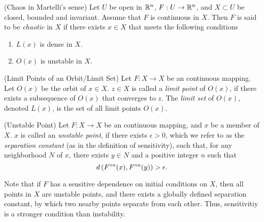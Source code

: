 \documentclass[12pt,draft,twoside]{book}
\begin{document}
  \begin{definition}
    (Chaos in Martelli's sense)
    Let $U$ be open in $\mathbb{R}^n$, $F: U \to \mathbb{R}^n$, and $X\subset U$ be closed, bounded and invariant.
    Assume that $F$ is continuous in $X$.
    Then $F$ is said to be \textit{chaotic} in $X$ if there exists $x \in X$ that meets the following conditions
    \begin{enumerate}
      \item $L(x)$ is dense in $X$.
      \item $O(x)$ is unstable in $X$.
    \end{enumerate}
    \label{defn:martelli}
  \end{definition}
  \begin{definition}
    (Limit Points of an Orbit/Limit Set)
    Let $F: X\to X$ be an continuous mapping.
    Let $O(x)$ be the orbit of $x \in X$.
    $z \in X$ is called a \textit{limit point} of $O(x)$, if there exists a subsequence of $O(x)$ that converges to $z$.
    The \textit{limit set} of $O(x)$, denoted $L(x)$, is the set of all limit points $O(x)$.
    \label{def:limset}
  \end{definition}

  \begin{definition}
    (Unstable Point)
    Let $F: X\to X$ be an continuous mapping, and $x$ be a member of $X$.
  $x$ is called an \textit{unstable point}, if there exists $\epsilon > 0$, which we refer to as the \textit{separation constant} (as in the definition of sensitivity), such that, for any neighborhood $N$ of $x$, there exists $y \in N$ and a positive integer $n$ such that 
  \begin{equation*}
    d\left( F^{\circ n}(x), F^{\circ n}(y) \right) > \epsilon.
  \end{equation*}
  \label{defn:unstable-orbit}
\end{definition}
Note that if $F$ has a sensitive dependence on initial conditions on $X$, then all points in $X$ are unstable points, and there exists a globally defined separation constant, by which two nearby points separate from each other.
Thus, sensitivitiy is a stronger condition than instability.
\end{document}
